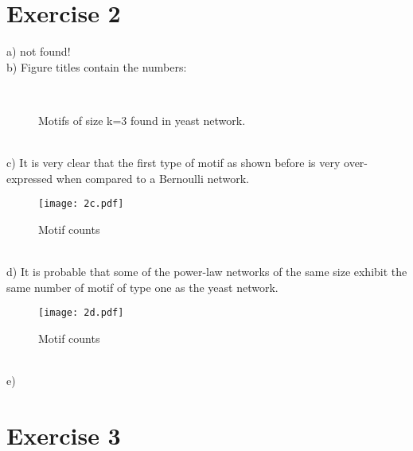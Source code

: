 \documentclass[a4paper]{article}
\begin{document}
\section*{Exercise 2}
a) not found!\\
b) Figure titles contain the numbers:
\begin{figure}[ht!]
  \begin{center}
    ~
    \caption{Motifs of size k=3 found in yeast network.}\label{fig_example}
 \end{center}
\end{figure}\\
\newpage
c) It is very clear that the first type of motif as shown before is very over-expressed when compared to a Bernoulli network.
\begin{figure}[ht!]
  \begin{center}
      \texttt{[image: 2c.pdf]}
    \caption{Motif counts}\label{fig:post}
 \end{center}
\end{figure}\\
d) It is probable that some of the power-law networks of the same size exhibit the same number of motif of type one as the yeast network.
\begin{figure}[ht!]
  \begin{center}
      \texttt{[image: 2d.pdf]}
    \caption{Motif counts}\label{fig:post2}
 \end{center}
\end{figure}\\
e)

\section*{Exercise 3}
\end{document}
